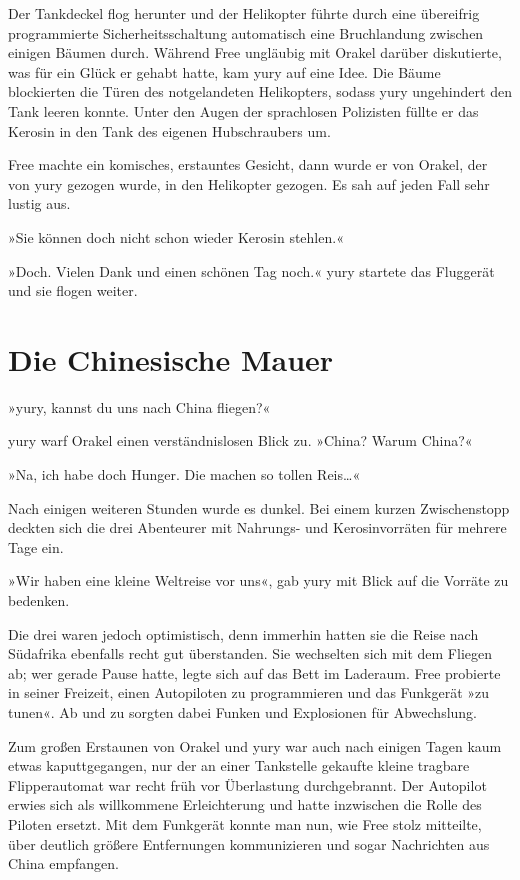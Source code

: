 Der Tankdeckel flog herunter und der Helikopter führte durch eine übereifrig programmierte Sicherheitsschaltung automatisch eine Bruchlandung zwischen einigen Bäumen durch. Während Free ungläubig mit Orakel darüber diskutierte, was für ein Glück er gehabt hatte, kam yury auf eine Idee. Die Bäume blockierten die Türen des notgelandeten Helikopters, sodass yury ungehindert den Tank leeren konnte. Unter den Augen der sprachlosen Polizisten füllte er das Kerosin in den Tank des eigenen Hubschraubers um.

Free machte ein komisches, erstauntes Gesicht, dann wurde er von Orakel, der von yury gezogen wurde, in den Helikopter gezogen. Es sah auf jeden Fall sehr lustig aus.

»Sie können doch nicht schon wieder Kerosin stehlen.«

»Doch. Vielen Dank und einen schönen Tag noch.« yury startete das Fluggerät und sie flogen weiter.


\chapter{Die Chinesische Mauer}

»yury, kannst du uns nach China fliegen?«

yury warf Orakel einen verständnislosen Blick zu. »China? Warum China?«

»Na, ich habe doch Hunger. Die machen so tollen Reis…«

Nach einigen weiteren Stunden wurde es dunkel. Bei einem kurzen Zwischenstopp deckten sich die drei Abenteurer mit Nahrungs- und Kerosinvorräten für mehrere Tage ein.

»Wir haben eine kleine Weltreise vor uns«, gab yury mit Blick auf die Vorräte zu bedenken.

Die drei waren jedoch optimistisch, denn immerhin hatten sie die Reise nach Südafrika ebenfalls recht gut überstanden. Sie wechselten sich mit dem Fliegen ab; wer gerade Pause hatte, legte sich auf das Bett im Laderaum. Free probierte in seiner Freizeit, einen Autopiloten zu programmieren und das Funkgerät »zu tunen«. Ab und zu sorgten dabei Funken und Explosionen für Abwechslung.

Zum großen Erstaunen von Orakel und yury war auch nach einigen Tagen kaum etwas kaputtgegangen, nur der an einer Tankstelle gekaufte kleine tragbare Flipperautomat war recht früh vor Überlastung durchgebrannt. Der Autopilot erwies sich als willkommene Erleichterung und hatte inzwischen die Rolle des Piloten ersetzt. Mit dem Funkgerät konnte man nun, wie Free stolz mitteilte, über deutlich größere Entfernungen kommunizieren und sogar Nachrichten aus China empfangen.

